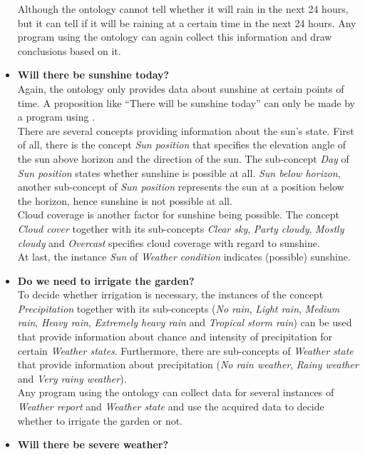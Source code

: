 \begin{itemize}
    Although the \thinkhomeweather ontology cannot tell whether it will rain in the next 24 hours, but it can tell if it will be raining at a certain time in the next 24 hours. Any program using the ontology can again collect this information and draw conclusions based on it.
  \item \textbf{Will there be sunshine today?}\\
    Again, the \thinkhomeweather ontology only provides data about sunshine at certain points of time. A proposition like ``There will be sunshine today'' can only be made by a program using \thinkhomeweather.\\
    There are several concepts providing information about the sun's state. First of all, there is the concept \emph{Sun position} that specifies the elevation angle of the sun above horizon and the direction of the sun. The sub-concept \emph{Day} of \emph{Sun position} states whether sunshine is possible at all. \emph{Sun below horizon}, another sub-concept of \emph{Sun position} represents the sun at a position below the horizon, hence sunshine is not possible at all.\\
    Cloud coverage is another factor for sunshine being possible. The concept \emph{Cloud cover} together with its sub-concepts \emph{Clear sky}, \emph{Party cloudy}, \emph{Mostly cloudy} and \emph{Overcast} specifies cloud coverage with regard to sunshine.\\
    At last, the instance \emph{Sun} of \emph{Weather condition} indicates (possible) sunshine.
  \item \textbf{Do we need to irrigate the garden?}\\
    To decide whether irrigation is necessary, the instances of the concept \emph{Precipitation} together with its sub-concepts (\emph{No rain}, \emph{Light rain}, \emph{Medium rain}, \emph{Heavy rain}, \emph{Extremely heavy rain} and \emph{Tropical storm rain}) can be used that provide information about chance and intensity of precipitation for certain \emph{Weather states}. Furthermore, there are sub-concepts of \emph{Weather state} that provide information about precipitation (\emph{No rain weather}, \emph{Rainy weather} and \emph{Very rainy weather}).\\
    Any program using the \thinkhomeweather ontology can collect data for several instances of \emph{Weather report} and \emph{Weather state} and use the acquired data to decide whether to irrigate the garden or not.
  \item \textbf{Will there be severe weather?}\\

\end{itemize}
